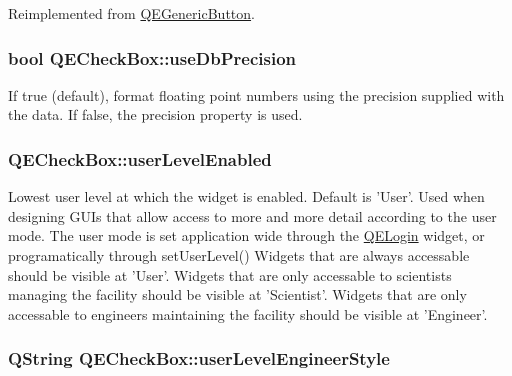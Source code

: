 Reimplemented from \hyperlink{classQEGenericButton}{QEGenericButton}.

\hypertarget{classQECheckBox_aa1d58ade253e2c37efda416af56828ad}{
\subsubsection[{useDbPrecision}]{\setlength{\rightskip}{0pt plus 5cm}bool QECheckBox::useDbPrecision}}
\label{classQECheckBox_aa1d58ade253e2c37efda416af56828ad}
If true (default), format floating point numbers using the precision supplied with the data. If false, the precision property is used. \hypertarget{classQECheckBox_a909abc180018e9564e7965454f95a85c}{
\subsubsection[{userLevelEnabled}]{ QECheckBox::userLevelEnabled}}
\label{classQECheckBox_a909abc180018e9564e7965454f95a85c}
Lowest user level at which the widget is enabled. Default is 'User'. Used when designing GUIs that allow access to more and more detail according to the user mode. The user mode is set application wide through the \hyperlink{classQELogin}{QELogin} widget, or programatically through setUserLevel() Widgets that are always accessable should be visible at 'User'. Widgets that are only accessable to scientists managing the facility should be visible at 'Scientist'. Widgets that are only accessable to engineers maintaining the facility should be visible at 'Engineer'. \hypertarget{classQECheckBox_ae4c0cf42959e19b91ae4894a10c22012}{
\subsubsection[{userLevelEngineerStyle}]{\setlength{\rightskip}{0pt plus 5cm}QString QECheckBox::userLevelEngineerStyle}}

